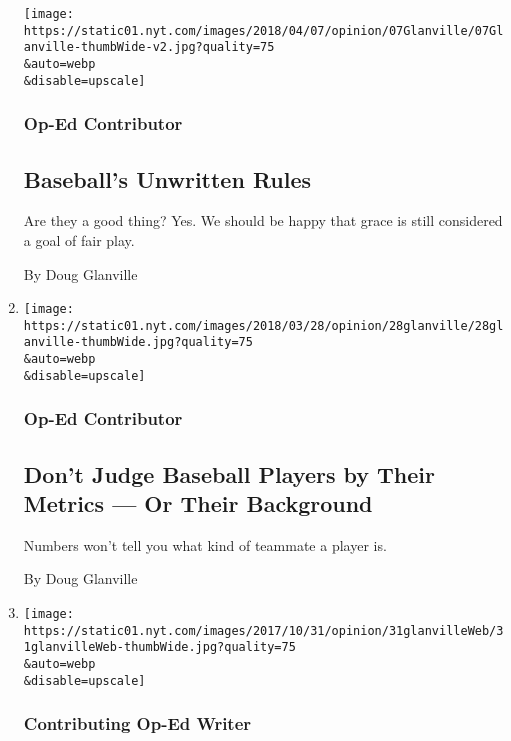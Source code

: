 \begin{enumerate}
  \texttt{[image: https://static01.nyt.com/images/2018/04/07/opinion/07Glanville/07Glanville-thumbWide-v2.jpg?quality=75\\\&auto=webp\\\&disable=upscale]}

  \hypertarget{op-ed-contributor}{%
  \subsubsection{Op-Ed Contributor}\label{op-ed-contributor}}

  \hypertarget{baseballs-unwritten-rules}{%
  \subsection{Baseball's Unwritten
  Rules}\label{baseballs-unwritten-rules}}

  Are they a good thing? Yes. We should be happy that grace is still
  considered a goal of fair play.

  By Doug Glanville
\item
  \href{/2018/03/28/opinion/baseball-season-begins.html}{}

  \texttt{[image: https://static01.nyt.com/images/2018/03/28/opinion/28glanville/28glanville-thumbWide.jpg?quality=75\\\&auto=webp\\\&disable=upscale]}

  \hypertarget{op-ed-contributor-1}{%
  \subsubsection{Op-Ed Contributor}\label{op-ed-contributor-1}}

  \hypertarget{dont-judge-baseball-players-by-their-metrics--or-their-background}{%
  \subsection{Don't Judge Baseball Players by Their Metrics --- Or Their
  Background}\label{dont-judge-baseball-players-by-their-metrics--or-their-background}}

  Numbers won't tell you what kind of teammate a player is.

  By Doug Glanville
\item
  \href{/2017/10/31/opinion/contributors/astros-dodgers-world-series.html}{}

  \texttt{[image: https://static01.nyt.com/images/2017/10/31/opinion/31glanvilleWeb/31glanvilleWeb-thumbWide.jpg?quality=75\\\&auto=webp\\\&disable=upscale]}

  \hypertarget{contributing-op-ed-writer}{%
  \subsubsection{Contributing Op-Ed
  Writer}\label{contributing-op-ed-writer}}


\end{enumerate}
